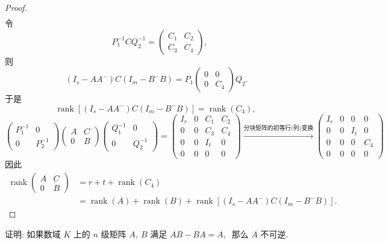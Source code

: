 \begin{proof}
$$\begin{aligned}
	\end{aligned}$$
	令  
	$$\quad P_{1}^{-1} C Q_{2}^{-1}=\left(\begin{array}{ll}
		C_{1} & C_{2} \\ 
		C_{3} & C_{4}
	\end{array}\right) ,\ $$
	则 
	$$ \left(I_{s}-A A^{-}\right) C\left(I_{m}-B^{-} B\right)=P_{1}
	\left(\begin{array}{cc}
		0 & 0 \\ 
		0 & C_{4}
	\end{array}\right) Q_{2} .$$
	于是 
	$$ \operatorname{rank}\left[\left(I_{s}-A A^{-}\right) C\left(I_{m}-B^{-} B\right)\right]=\operatorname{rank}\left(C_{4}\right) ,\ $$
	$$\begin{pmatrix}
		P_1^{-1} & 0\\
		0        & P_2^{-1}
	\end{pmatrix}
	\begin{pmatrix}
		A & C\\
		0 & B
	\end{pmatrix}
	\begin{pmatrix}
		Q_1^{-1} & 0\\
		0 		 & Q_2^{-1}
	\end{pmatrix}=
	\begin{pmatrix}
		I_r & 0 & C_1 & C_2\\
		0   & 0 & C_3 & C_4\\
		0   & 0 & I_t & 0\\
		0   & 0 & 0   & 0
	\end{pmatrix}
	\xrightarrow[]{\text{分块矩阵的初等行(列)变换}}
	\begin{pmatrix}
		I_r & 0 & 0   & 0\\
		0   & 0 & I_t & 0\\
		0   & 0 & 0   & C_4\\
		0   & 0 & 0   & 0
	\end{pmatrix}$$
	因此
	$$\begin{aligned}
		\operatorname{rank}\left(\begin{array}{ll}
			A & C \\
			0 & B
		\end{array}\right) & =r+t+\operatorname{rank}\left(C_{4}\right) \\
		& =\operatorname{rank}(A)+\operatorname{rank}(B)+\operatorname{rank}\left[\left(I_{s}-A A^{-}\right) C\left(I_{m}-B^{-} B\right)\right] .
	\end{aligned}$$
\end{proof}
\newpage
\begin{problem}
	证明: 如果数域  $K$  上的 $ n $ 级矩阵 $ A ,\  B$  满足  $A B-B A=A ,\ $ 那么  $A $ 不可逆.
\end{problem}
